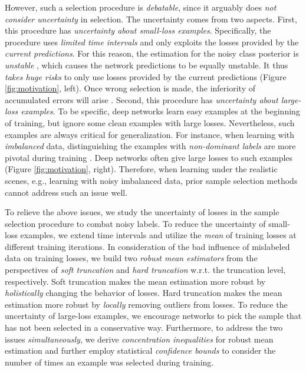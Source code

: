 \documentclass[11pt]{article}
\begin{document}
However, such a selection procedure is \textit{debatable}, since it arguably does \textit{not consider uncertainty} in selection. The uncertainty comes from two aspects. First, this procedure has \textit{uncertainty about small-loss examples}. Specifically, the procedure uses \textit{limited time intervals} and only exploits the losses provided by the \textit{current predictions}. For this reason, the estimation for the noisy class posterior is \textit{unstable} \citep{yao2020dual}, which causes the network predictions to be equally unstable. It thus \textit{takes huge risks} to only use losses provided by the current predictions (Figure \ref{fig:motivation}, left). Once wrong selection is made, the inferiority of accumulated errors will arise \citep{yu2019does}. Second, this procedure has \textit{uncertainty about large-loss examples}. To be specific, deep networks learn easy examples at the beginning of training, but ignore some clean examples with large losses. Nevertheless, such examples are always critical for generalization. For instance, when learning with \textit{imbalanced} data, distinguishing the examples with \textit{non-dominant labels} are more pivotal during training \citep{menon2020long}. Deep networks often give large losses to such examples (Figure \ref{fig:motivation}, right). Therefore, when learning under 
the realistic scenes, e.g., learning with noisy imbalanced data, prior sample selection methods cannot address such an issue well.


To relieve the above issues, we study the uncertainty of losses in the sample selection procedure to combat noisy labels. To reduce the uncertainty of small-loss examples, we extend time intervals and utilize the \emph{mean} of training losses at different training iterations. In consideration of the bad influence of mislabeled data on training losses, we build two \textit{robust mean estimators} from the perspectives of \textit{soft truncation} and \textit{hard truncation} w.r.t. the truncation level, respectively. Soft truncation makes the mean estimation more robust by \textit{holistically} changing the behavior of losses. Hard truncation makes the mean estimation more robust by \textit{locally} removing outliers from losses. To reduce the uncertainty of large-loss examples, we encourage networks to pick the sample that has not been selected in a conservative way. Furthermore, to address the two issues \textit{simultaneously}, we derive \textit{concentration inequalities} \citep{boucheron2013concentration} for robust mean estimation and further employ statistical \textit{confidence bounds} \citep{auer2002using} to consider the number of times an example was selected during training. 
\end{document}
